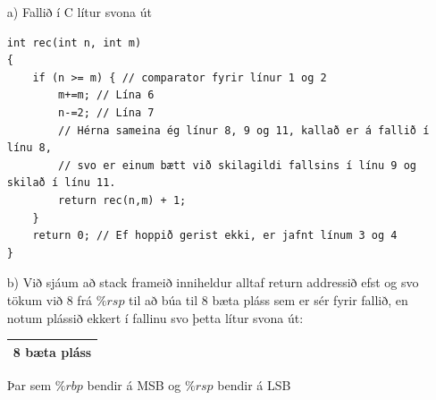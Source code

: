 \documentclass{article}
\begin{document}
	\begin{itemize}
		\item[a)] Fallið í C lítur svona út
\begin{verbatim}
int rec(int n, int m)
{
    if (n >= m) { // comparator fyrir línur 1 og 2
        m+=m; // Lína 6
        n-=2; // Lína 7
        // Hérna sameina ég línur 8, 9 og 11, kallað er á fallið í línu 8, 
        // svo er einum bætt við skilagildi fallsins í línu 9 og skilað í línu 11.
        return rec(n,m) + 1;
    }
    return 0; // Ef hoppið gerist ekki, er jafnt línum 3 og 4
}
\end{verbatim}
		\item[b)] Við sjáum að stack frameið inniheldur alltaf return addressið efst og svo tökum við 8 frá $\%rsp$ til að búa til 8 bæta pláss sem er sér 
			fyrir fallið, en notum plássið ekkert í fallinu svo þetta lítur svona út:

			\begin{center}
				\begin{tabular}{ |c| }
					\hline
					8 bæta pláss \\
					\hline
				\end{tabular}
			\end{center}

			Þar sem $\%rbp$ bendir á MSB og $\%rsp$ bendir á LSB

	\end{itemize}
\end{document}
